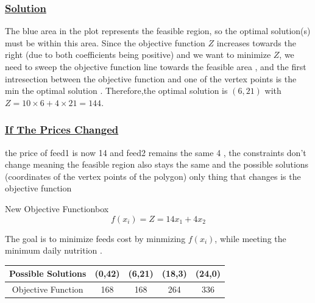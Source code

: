 \subsubsection*{\underline{Solution}}

The blue area in the plot represents the feasible region, so the optimal solution(s) must be within this area. Since
the objective function \( Z \) increases towards the right (due to both coefficients being positive) and we want to
minimize \( Z \), we need to sweep the objective function line towards the feasible area , and the first intresection 
between the objective function and one of the vertex points is the min the optimal solution . Therefore,the optimal 
solution is \((6, 21)\) with \( Z = 10 \times 6 + 4 \times 21 = 144 \).

\vspace{0.25cm}
\subsubsection*{\underline{If The Prices Changed}}
the price of feed1 is now 14 and feed2 remains the same 4 , the constraints don't change meaning the feasible region
also stays the same and the possible solutions (coordinates of the vertex points of the polygon) only thing that
changes is the objective function 

\vspace{0.5cm}
\begin{prettyBox}{New Objective Function}{box}
\[
f(x_i) = Z = 14x_1 + 4x_2  
\]
\begin{center}
The goal is to minimize feeds cost by minmizing \(f(x_i)\), while meeting the minimum daily nutrition .
\end{center}
\end{prettyBox}

\vspace{0.75cm} 
\begin{center}
    \begin{tabular}{|c|c|c|c|c|}
        \hline 
        Possible Solutions  & (0,42) & (6,21) & (18,3) & (24,0)\\
        \hline 
        Objective Function & 168 & 168 & 264 & 336\\
        \hline 
    \end{tabular}
\end{center}


